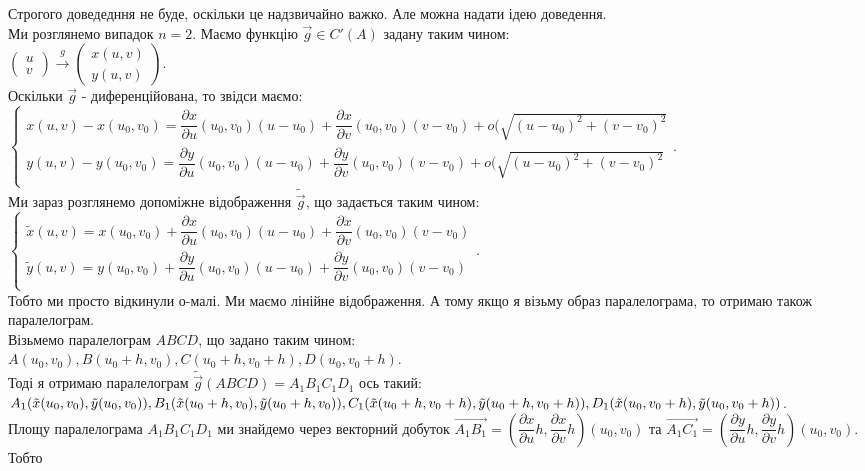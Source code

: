 \documentclass[a4paper, 10pt]{article}
\def\departial#1#2{\dfrac{\partial {#1}}{\partial {#2}}}
\theoremstyle{theoremdd}
\theoremstyle{theoremdd}
\theoremstyle{theoremdd}
\theoremstyle{theoremdd}
\theoremstyle{theoremdd}
\theoremstyle{theoremdd}
\theoremstyle{theoremdd}
\theoremstyle{theoremdd}
\begin{document}
Строгого доведедння не буде, оскільки це надзвичайно важко. Але можна надати ідею доведення.
\bigskip \\
Ми розглянемо випадок $n = 2$. Маємо функцію $\vec{g} \in C'(A)$ задану таким чином:\\
$\begin{pmatrix}
u \\ v
\end{pmatrix} \overset{g}{\to} \begin{pmatrix}
x(u,v) \\ y(u,v)
\end{pmatrix}$.\\
Оскільки $\vec{g}$ - диференційована, то звідси маємо:\\
$\begin{cases}
x(u,v) - x(u_0,v_0) = \departial{x}{u}(u_0,v_0)(u-u_0) + \departial{x}{v}(u_0,v_0)(v-v_0) + o( \sqrt{(u-u_0)^2 + (v-v_0)^2} \\
y(u,v) - y(u_0,v_0) = \departial{y}{u}(u_0,v_0)(u-u_0) + \departial{y}{v}(u_0,v_0)(v-v_0) + o( \sqrt{(u-u_0)^2 + (v-v_0)^2} \\
\end{cases}$.\\
Ми зараз розглянемо допоміжне відображення $\tilde{\vec{g}}$, що задається таким чином:\\
$\begin{cases}
\tilde{x}(u,v) = x(u_0,v_0) + \departial{x}{u}(u_0,v_0)(u-u_0) + \departial{x}{v}(u_0,v_0)(v-v_0) \\
\tilde{y}(u,v) =  y(u_0,v_0) +\departial{y}{u}(u_0,v_0)(u-u_0) + \departial{y}{v}(u_0,v_0)(v-v_0) \\
\end{cases}$.\\
Тобто ми просто відкинули о-малі. Ми маємо лінійне відображення. А тому якщо я візьму образ паралелограма, то отримаю також паралелограм.\\
Візьмемо паралелограм $ABCD$, що задано таким чином:\\ $A(u_0,v_0), B(u_0+h,v_0), C(u_0+h,v_0+h), D(u_0,v_0+h)$.\\
Тоді я отримаю паралелограм $\tilde{\vec{g}}(ABCD) = A_1B_1C_1D_1$ ось такий:\\
$A_1(\tilde{x}(u_0,v_0),\tilde{y}(u_0,v_0)),B_1(\tilde{x}(u_0+h,v_0),\tilde{y}(u_0+h,v_0)),C_1(\tilde{x}(u_0+h,v_0+h),\tilde{y}(u_0+h,v_0+h)),\\ D_1(\tilde{x}(u_0,v_0+h),\tilde{y}(u_0,v_0+h))$.\\
Площу паралелограма $A_1B_1C_1D_1$ ми знайдемо через векторний добуток $\overrightarrow{A_1B_1} = \left( \departial{x}{u}h, \departial{x}{v}h \right)(u_0,v_0)$ та $\overrightarrow{A_1C_1} = \left( \departial{y}{u}h, \departial{y}{v}h \right)(u_0,v_0)$. Тобто\\
\end{document}
